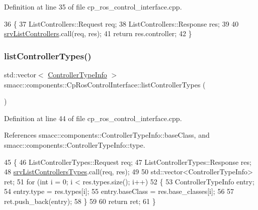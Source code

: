 Definition at line 35 of file cp\+\_\+ros\+\_\+control\+\_\+interface.\+cpp.


\begin{DoxyCode}
36 \{
37     ListControllers::Request req;
38     ListControllers::Response res;
39 
40     \hyperlink{classsmacc_1_1components_1_1CpRosControlInterface_aec2d2eb63ad4f04741493329e6c33696}{srvListControllers}.call(req, res);
41     \textcolor{keywordflow}{return} res.controller;
42 \}
\end{DoxyCode}
\mbox{\label{classsmacc_1_1components_1_1CpRosControlInterface_ae900aa88dff13169cdb22c68a7e5d539}} 
\subsubsection{\texorpdfstring{list\+Controller\+Types()}{listControllerTypes()}}
{\footnotesize\ttfamily std\+::vector$<$ \hyperlink{structsmacc_1_1components_1_1ControllerTypeInfo}{Controller\+Type\+Info} $>$ smacc\+::components\+::\+Cp\+Ros\+Control\+Interface\+::list\+Controller\+Types (\begin{DoxyParamCaption}{ }\end{DoxyParamCaption})}



Definition at line 44 of file cp\+\_\+ros\+\_\+control\+\_\+interface.\+cpp.



References smacc\+::components\+::\+Controller\+Type\+Info\+::base\+Class, and smacc\+::components\+::\+Controller\+Type\+Info\+::type.


\begin{DoxyCode}
45 \{
46     ListControllerTypes::Request req;
47     ListControllerTypes::Response res;
48     \hyperlink{classsmacc_1_1components_1_1CpRosControlInterface_a5a4983fca48da646b5fc94ce1f0e4114}{srvListControllersTypes}.call(req, res);
49 
50     std::vector<ControllerTypeInfo> ret;
51     \textcolor{keywordflow}{for} (\textcolor{keywordtype}{int} i = 0; i < res.types.size(); i++)
52     \{
53         ControllerTypeInfo entry;
54         entry.type = res.types[i];
55         entry.baseClass = res.base\_classes[i];
56 
57         ret.push\_back(entry);
58     \}
59 
60     \textcolor{keywordflow}{return} ret;
61 \}
\end{DoxyCode}
\mbox{\label{classsmacc_1_1components_1_1CpRosControlInterface_ab810c680f5429731c9c83345f9821016}} 
